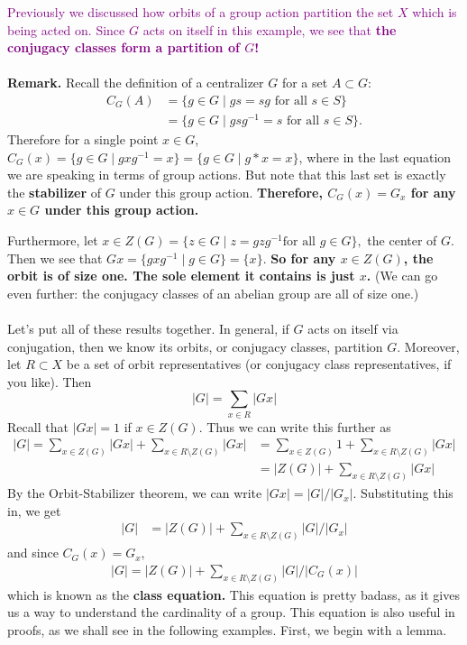     \textcolor{purple}{Previously we discussed how orbits of a group action partition the
    set $X$ which is being acted on. Since $G$ acts on itself in this
    example, we see that \textbf{the conjugacy classes form a
    partition of $G$!}}
    \\
    \\
    \textbf{Remark.}
    Recall the definition of a centralizer $G$ for a set $A \subset
    G$: 
    \begin{align*}
        C_G(A) & = \{g \in G \mid gs = sg \text{ for all } s \in S\}\\
        & = \{g \in G \mid gsg^{-1} = s  \text{ for all } s \in S\}.
    \end{align*}
    Therefore for a single point $x \in G$, $C_G(x) = \{g \in G \mid
    gxg^{-1} = x \} = \{g \in G \mid g * x = x\}$, where in the last
    equation we are speaking in terms of group actions. But note that
    this last set is exactly the \textbf{stabilizer} of $G$ under this
    group action. \textbf{\textcolor{NavyBlue}{Therefore, $C_G(x) = G_x$ for any $x \in G$ under
    this group action.}}

    Furthermore, let $x \in Z(G) = \{z \in G \mid z = gzg^{-1} \text{
    for all } g \in G\},$ the center of $G$. Then we see that $Gx =
    \{gxg^{-1} \mid g \in G\} = \{x\}$. \textbf{\textcolor{NavyBlue}{So for any $x \in Z(G)$, the
    orbit is of size one. The sole element it contains is just $x$.}} (We can go even further: the conjugacy
    classes of an abelian group are all of size one.)
    \\
    \\
    Let's put all of these results together. In general, if $G$
    acts on itself via conjugation, then we know its orbits, or
    conjugacy classes, partition $G$. Moreover, let $R \subset X$ be a set of
    orbit representatives (or conjugacy class representatives, if you
    like). Then 
    \[
        |G| = \sum_{x \in R}|Gx|
    \]
    Recall that $|Gx| = 1$ if $x \in Z(G)$. Thus we can write this
    further as 
    \begin{align*}
        |G| = 
        \sum_{x \in Z(G)}|Gx| + \sum_{x \in R\setminus Z(G)} |Gx|
        & = \sum_{x \in Z(G)}1 + \sum_{x \in R\setminus Z(G)} |Gx|\\
        & = |Z(G)| + \sum_{x \in R\setminus Z(G)} |Gx|
    \end{align*}
    By the Orbit-Stabilizer theorem, we can write $|Gx| = |G|/|G_x|$.
    Substituting this in, we get 
    \begin{align*}
        |G| &= |Z(G)| + \sum_{x \in R\setminus Z(G)} |G|/|G_x|
    \end{align*}
    and since $C_G(x) = G_x$,
    \begin{align*}
        |G| = |Z(G)| + \sum_{x \in R\setminus Z(G)} |G|/|C_G(x)|
    \end{align*}
    which is known as the \textbf{class equation.} This equation is
    pretty badass, as it gives us a way to understand the cardinality
    of a group. This equation is also useful in proofs, as we shall
    see in the following examples. First, we begin with a lemma. 

